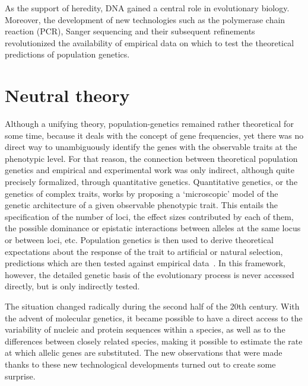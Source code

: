 As the support of heredity, DNA gained a central role in evolutionary biology.
Moreover, the development of new technologies such as the polymerase chain reaction (PCR), Sanger sequencing and their subsequent refinements revolutionized the availability of empirical data on which to test the theoretical predictions of population genetics.


\section{Neutral theory}

Although a unifying theory, population-genetics remained rather theoretical for some time, because it deals with the concept of gene frequencies, yet there was no direct way to unambiguously identify the genes with the observable traits at the phenotypic level.
For that reason, the connection between theoretical population genetics and empirical and experimental work was only indirect, although quite precisely formalized, through quantitative genetics.
Quantitative genetics, or the genetics of complex traits, works by proposing a ‘microscopic’ model of the genetic architecture of a given observable phenotypic trait.
This entails the specification of the number of loci, the effect sizes contributed by each of them, the possible dominance or epistatic interactions between alleles at the same locus or between loci, etc.
Population genetics is then used to derive theoretical expectations about the response of the trait to artificial or natural selection, predictions which are then tested against empirical data~\citep{Lande1976,Lande1980,Lande1983}.
In this framework, however, the detailed genetic basis of the evolutionary process is never accessed directly, but is only indirectly tested.

The situation changed radically during the second half of the 20th century.
With the advent of molecular genetics, it became possible to have a direct access to the variability of nucleic and protein sequences within a species, as well as to the differences between closely related species, making it possible to estimate the rate at which allelic genes are substituted.
The new observations that were made thanks to these new technological developments turned out to create some surprise.

